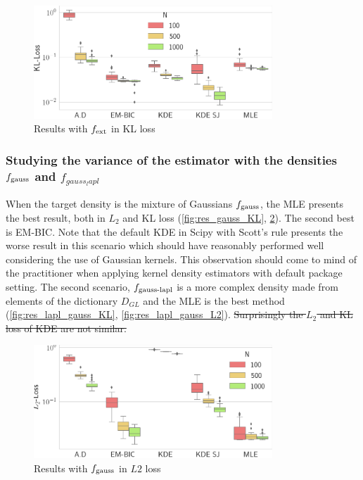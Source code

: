 \begin{figure}
    \includegraphics[width=0.8\textwidth]{./TeX_files/res_lapl_gauss_not_dict_KL.png}
    \caption{Results with $f_{\textnormal{ext}}$ in KL loss}
    \label{fig:res_ext_KL}
\end{figure}
\subsubsection{Studying the variance of the estimator with the densities $f_{\textnormal{gauss}}$ and $f_{gauss_lapl}$}

When the target density is the mixture of Gaussians $f_{\textnormal{gauss}}$, the MLE presents the best result, both in $L_2$ and KL loss (\cref{fig:res_gauss_KL}, \cref{fig:res_gauss_L2}). The second best is EM-BIC. Note that the default KDE in Scipy with Scott's rule presents the worse result in this scenario which should have reasonably performed well considering the use of Gaussian kernels. This observation should come to mind of the practitioner when applying kernel density estimators with default package setting. The second scenario, $f_{\textnormal{gauss-lapl}}$ is a more complex density made from elements of the dictionary $D_{GL}$ and the MLE is the best method (\cref{fig:res_lapl_gauss_KL}, \cref{fig:res_lapl_gauss_L2}). \sout{Surprisingly the $L_2$ and KL loss of KDE are not similar.}
\begin{figure}
    \includegraphics[width=0.8\textwidth]{./TeX_files/res_gauss_L2.png}
    \caption{Results with $f_{\textnormal{gauss}}$ in $L2$ loss}
    \label{fig:res_gauss_L2}
\end{figure}


